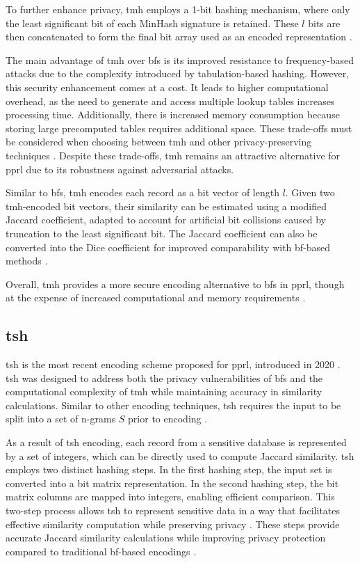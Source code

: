 To further enhance privacy, \ac{tmh} employs a 1-bit hashing mechanism, where only the least significant bit of each MinHash signature is retained.
These $l$ bits are then concatenated to form the final bit array used as an encoded representation \cite{schaefer2024}.

The main advantage of \ac{tmh} over \ac{bf}s is its improved resistance to frequency-based attacks due to the complexity introduced by tabulation-based hashing.
However, this security enhancement comes at a cost.
It leads to higher computational overhead, as the need to generate and access multiple lookup tables increases processing time.
Additionally, there is increased memory consumption because storing large precomputed tables requires additional space.
These trade-offs must be considered when choosing between \ac{tmh} and other privacy-preserving techniques \cite{schaefer2024,vidanage2020graph}.
Despite these trade-offs, \ac{tmh} remains an attractive alternative for \ac{pprl} due to its robustness against adversarial attacks.

Similar to \ac{bf}s, \ac{tmh} encodes each record as a bit vector of length $l$.
Given two \ac{tmh}-encoded bit vectors, their similarity can be estimated using a modified Jaccard coefficient, adapted to account for artificial bit collisions caused by truncation to the least significant bit.
The Jaccard coefficient can also be converted into the Dice coefficient for improved comparability with \ac{bf}-based methods \cite{vidanage2020graph,schaefer2024}.

Overall, \ac{tmh} provides a more secure encoding alternative to \ac{bf}s in \ac{pprl}, though at the expense of increased computational and memory requirements \cite{schaefer2024, vidanage2020graph}.


\subsection{\ac{tsh}} \label{sec:tsh}

\ac{tsh} is the most recent encoding scheme proposed for \ac{pprl}, introduced in 2020 \cite{ranbaduge2020secure}.
\ac{tsh} was designed to address both the privacy vulnerabilities of \ac{bf}s and the computational complexity of \ac{tmh} while maintaining accuracy in similarity calculations.
Similar to other encoding techniques, \ac{tsh} requires the input to be split into a set of n-grams $S$ prior to encoding \cite{ranbaduge2020secure}.

As a result of \ac{tsh} encoding, each record from a sensitive database is represented by a set of integers, which can be directly used to compute Jaccard similarity.
\ac{tsh} employs two distinct hashing steps.
In the first hashing step, the input set is converted into a bit matrix representation.
In the second hashing step, the bit matrix columns are mapped into integers, enabling efficient comparison.
This two-step process allows \ac{tsh} to represent sensitive data in a way that facilitates effective similarity computation while preserving privacy \cite{schaefer2024}.
These steps provide accurate Jaccard similarity calculations while improving privacy protection compared to traditional \ac{bf}-based encodings \cite{ranbaduge2020secure}.

